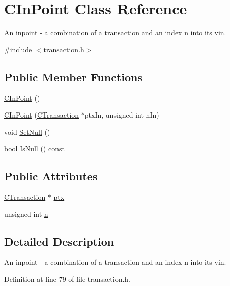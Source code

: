\hypertarget{class_c_in_point}{}\section{C\+In\+Point Class Reference}
\label{class_c_in_point}


An inpoint -\/ a combination of a transaction and an index n into its vin.  




{\ttfamily \#include $<$transaction.\+h$>$}

\subsection*{Public Member Functions}
\begin{DoxyCompactItemize}
\item 
\hyperlink{class_c_in_point_ad44d4164a178cd7b0ddca6dd9f862d50}{C\+In\+Point} ()
\item 
\hyperlink{class_c_in_point_ac054c350f76431079350e9e5ac18fb0f}{C\+In\+Point} (\hyperlink{class_c_transaction}{C\+Transaction} $\ast$ptx\+In, unsigned int n\+In)
\item 
void \hyperlink{class_c_in_point_af92945e76098bd920049f9f85a730e22}{Set\+Null} ()
\item 
bool \hyperlink{class_c_in_point_ab1f45ee1bda5013ccff208bf8d18d2ce}{Is\+Null} () const 
\end{DoxyCompactItemize}
\subsection*{Public Attributes}
\begin{DoxyCompactItemize}
\item 
\hyperlink{class_c_transaction}{C\+Transaction} $\ast$ \hyperlink{class_c_in_point_a2af1553adce95fa8504eb2979cbc9cf3}{ptx}
\item 
unsigned int \hyperlink{class_c_in_point_afd43eee38268aac7ff91d065697032ad}{n}
\end{DoxyCompactItemize}


\subsection{Detailed Description}
An inpoint -\/ a combination of a transaction and an index n into its vin. 

Definition at line 79 of file transaction.\+h.



